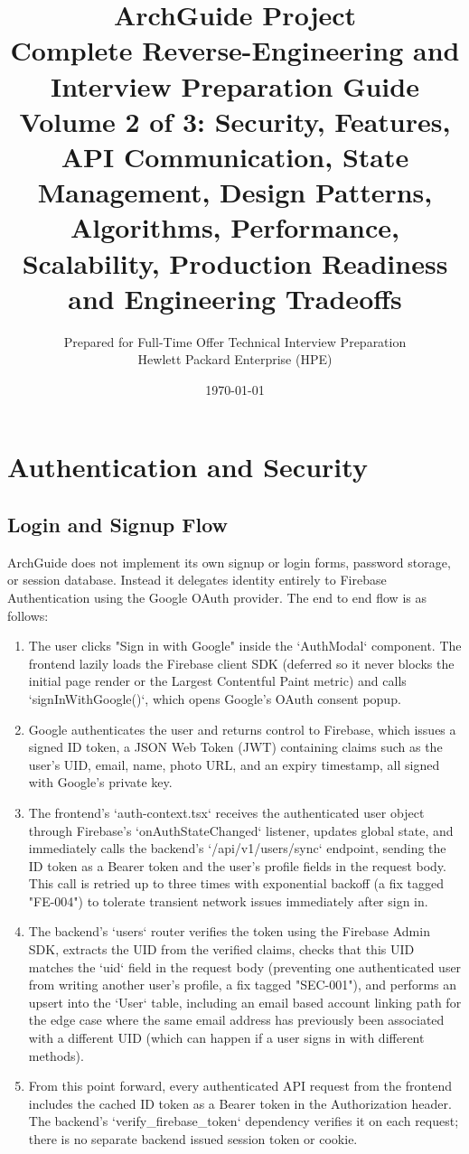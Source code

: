 \documentclass[11pt,a4paper]{report}
\title{\Huge \textbf{ArchGuide Project} \\[0.4cm] \Large Complete Reverse-Engineering and Interview Preparation Guide \\[0.6cm] \large Volume 2 of 3: Security, Features, API Communication, State Management, Design Patterns, Algorithms, Performance, Scalability, Production Readiness and Engineering Tradeoffs}
\author{Prepared for Full-Time Offer Technical Interview Preparation \\ Hewlett Packard Enterprise (HPE)}
\date{\today}
\begin{document}
\maketitle
\tableofcontents

\chapter{Authentication and Security}

\section{Login and Signup Flow}

ArchGuide does not implement its own signup or login forms, password storage, or session database. Instead it delegates identity entirely to Firebase Authentication using the Google OAuth provider. The end to end flow is as follows:

\begin{enumerate}[leftmargin=*]
  \item The user clicks "Sign in with Google" inside the `AuthModal` component. The frontend lazily loads the Firebase client SDK (deferred so it never blocks the initial page render or the Largest Contentful Paint metric) and calls `signInWithGoogle()`, which opens Google's OAuth consent popup.
  \item Google authenticates the user and returns control to Firebase, which issues a signed ID token, a JSON Web Token (JWT) containing claims such as the user's UID, email, name, photo URL, and an expiry timestamp, all signed with Google's private key.
  \item The frontend's `auth-context.tsx` receives the authenticated user object through Firebase's `onAuthStateChanged` listener, updates global state, and immediately calls the backend's `/api/v1/users/sync` endpoint, sending the ID token as a Bearer token and the user's profile fields in the request body. This call is retried up to three times with exponential backoff (a fix tagged "FE-004") to tolerate transient network issues immediately after sign in.
  \item The backend's `users` router verifies the token using the Firebase Admin SDK, extracts the UID from the verified claims, checks that this UID matches the `uid` field in the request body (preventing one authenticated user from writing another user's profile, a fix tagged "SEC-001"), and performs an upsert into the `User` table, including an email based account linking path for the edge case where the same email address has previously been associated with a different UID (which can happen if a user signs in with different methods).
  \item From this point forward, every authenticated API request from the frontend includes the cached ID token as a Bearer token in the Authorization header. The backend's `verify_firebase_token` dependency verifies it on each request; there is no separate backend issued session token or cookie.
\end{enumerate}
\end{document}
